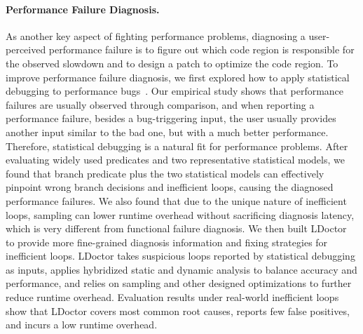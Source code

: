 \documentclass[10pt]{article}
\begin{document}
\vspace{-.1in}
\paragraph{Performance Failure Diagnosis.}
As another key aspect of fighting performance problems,
diagnosing a user-perceived performance failure is to figure out which code 
region is responsible for the observed slowdown and 
to design a patch to optimize the code region.
To improve performance failure diagnosis, 
we first explored how to 
apply statistical debugging to performance bugs~\cite{Song14OOPSLA}. 
Our empirical study shows that performance failures are usually observed through comparison,
and when reporting a performance failure, besides a bug-triggering input, 
the user usually provides another input similar to the bad one, 
but with a much better performance.
Therefore, statistical debugging is a natural fit for performance problems. 
After evaluating widely used predicates and 
two representative statistical models, 
we found that branch predicate plus the two statistical models can effectively 
pinpoint wrong branch decisions and inefficient loops, 
causing the diagnosed performance failures. 
We also found that
due to the unique nature of inefficient loops, 
sampling can lower runtime overhead without sacrificing diagnosis latency, 
which is very different from functional failure diagnosis.
We then built LDoctor~\cite{Song17ICSE} to provide more 
fine-grained diagnosis information and fixing strategies for inefficient loops. 
LDoctor takes suspicious loops reported by 
statistical debugging as inputs, 
applies hybridized static and dynamic analysis to 
balance accuracy and performance, 
and relies on sampling and other designed optimizations 
to further reduce runtime overhead. 
Evaluation results under real-world inefficient loops 
show that LDoctor covers most common root causes, 
reports few false positives, and incurs a low runtime overhead. 

\vspace{-.1in}
\end{document}
